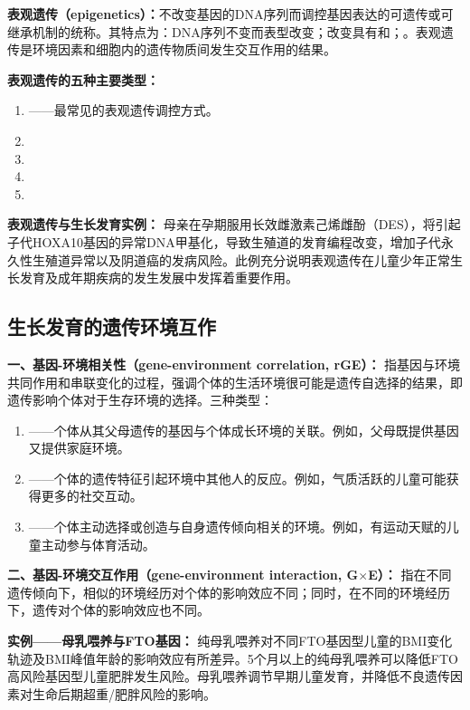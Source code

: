 \begin{keybox}
\textbf{表观遗传（epigenetics）：}不改变基因的DNA序列而调控基因表达的可遗传或可继承机制的统称。其特点为：DNA序列不变而表型改变；改变具有和；。表观遗传是环境因素和细胞内的遗传物质间发生交互作用的结果。

\textbf{表观遗传的五种主要类型：}
\begin{enumerate}[leftmargin=*]
    \item {}——最常见的表观遗传调控方式。
    \item {}
    \item {}
    \item {}
    \item {}
\end{enumerate}

\textbf{表观遗传与生长发育实例：}
母亲在孕期服用长效雌激素己烯雌酚（DES），将引起子代HOXA10基因的异常DNA甲基化，导致生殖道的发育编程改变，增加子代永久性生殖道异常以及阴道癌的发病风险。此例充分说明表观遗传在儿童少年正常生长发育及成年期疾病的发生发展中发挥着重要作用。
\end{keybox}

\subsection{生长发育的遗传环境互作}

\begin{keybox}
\textbf{一、基因-环境相关性（gene-environment correlation, rGE）：}
指基因与环境共同作用和串联变化的过程，强调个体的生活环境很可能是遗传自选择的结果，即遗传影响个体对于生存环境的选择。三种类型：

\begin{enumerate}[leftmargin=*]
    \item {}——个体从其父母遗传的基因与个体成长环境的关联。例如，父母既提供基因又提供家庭环境。
    \item {}——个体的遗传特征引起环境中其他人的反应。例如，气质活跃的儿童可能获得更多的社交互动。
    \item {}——个体主动选择或创造与自身遗传倾向相关的环境。例如，有运动天赋的儿童主动参与体育活动。
\end{enumerate}

\textbf{二、基因-环境交互作用（gene-environment interaction, G$\times$E）：}
指在不同遗传倾向下，相似的环境经历对个体的影响效应不同；同时，在不同的环境经历下，遗传对个体的影响效应也不同。

\textbf{实例——母乳喂养与FTO基因：}
纯母乳喂养对不同FTO基因型儿童的BMI变化轨迹及BMI峰值年龄的影响效应有所差异。5个月以上的纯母乳喂养可以降低FTO高风险基因型儿童肥胖发生风险。母乳喂养调节早期儿童发育，并降低不良遗传因素对生命后期超重/肥胖风险的影响。
\end{keybox}

